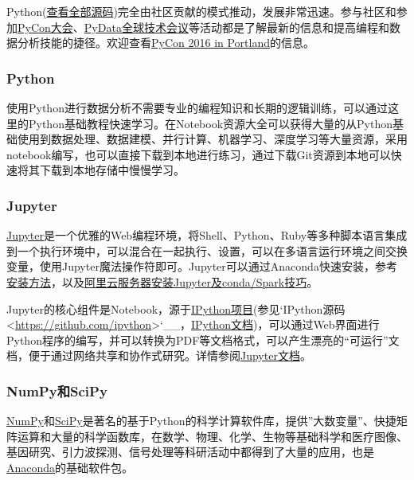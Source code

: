 \documentclass[letterpaper,10pt,english]{sphinxmanual}
\begin{document}
Python(\href{https://github.com/python}{查看全部源码})完全由社区贡献的模式推动，发展非常迅速。参与社区和参加\href{https://us.pycon.org/}{PyCon大会}、\href{http://pydata.org/}{PyData全球技术会议}等活动都是了解最新的信息和提高编程和数据分析技能的捷径。欢迎查看\href{https://us.pycon.org/2016/}{PyCon
2016 in Portland}的信息。


\subsubsection{Python}
\label{gispark_paas:Python}
使用Python进行数据分析不需要专业的编程知识和长期的逻辑训练，可以通过这里的Python基础教程快速学习。在Notebook资源大全可以获得大量的从Python基础使用到数据处理、数据建模、并行计算、机器学习、深度学习等大量资源，采用notebook编写，也可以直接下载到本地进行练习，通过下载Git资源到本地可以快速将其下载到本地存储中慢慢学习。


\subsubsection{Jupyter}
\label{gispark_paas:Jupyter}
\href{http://jupyter.org/}{Jupyter}是一个优雅的Web编程环境，将Shell、Python、Ruby等多种脚本语言集成到一个执行环境中，可以混合在一起执行、设置，可以在多语言运行环境之间交换变量，使用Jupyter魔法操作符即可。Jupyter可以通过Anaconda快速安装，参考\href{http://my.oschina.net/u/2306127/blog/636289}{安装方法}，以及\href{http://my.oschina.net/u/2306127/blog/657229}{阿里云服务器安装Jupyter及conda/Spark技巧}。

Jupyter的核心组件是Notebook，源于\href{https://ipython.org/}{IPython项目}(参见{}`IPython源码 \textless{}\url{https://github.com/ipython}\textgreater{}{}`\_\_，\href{https://ipython.org/documentation.html}{IPython文档})，可以通过Web界面进行Python程序的编写，并可以转换为PDF等文档格式，可以产生漂亮的“可运行”文档，便于通过网络共享和协作式研究。详情参阅\href{http://jupyter.readthedocs.io/en/latest/index.html}{Jupyter文档}。


\subsubsection{NumPy和SciPy}
\label{gispark_paas:NumPy_u548cSciPy}
\href{http://numpy.readthedocs.io/en/latest/}{NumPy}和\href{http://scipy.org/}{SciPy}是著名的基于Python的科学计算软件库，提供''大数变量''、快捷矩阵运算和大量的科学函数库，在数学、物理、化学、生物等基础科学和医疗图像、基因研究、引力波探测、信号处理等科研活动中都得到了大量的应用，也是\href{http://continuum.io/}{Anaconda}的基础软件包。
\end{document}
